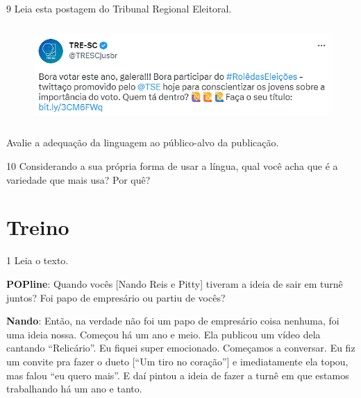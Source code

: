 \num{9} Leia esta postagem do Tribunal Regional Eleitoral.

\begin{figure}[H]
\centering
\includegraphics[width=5.26042in,height=1.47161in]{./imgSAEB_8_POR/media/image27.png}
\end{figure}

Avalie a adequação da linguagem ao público-alvo da publicação.


\num{10} Considerando a sua própria forma de usar a língua, qual você acha que é a variedade que mais usa? Por quê?


\section*{Treino}

\num{1} Leia o texto.

\begin{myquote}\textbf{POPline}: Quando vocês {[}Nando Reis e Pitty{]} tiveram a ideia
de sair em turnê juntos? Foi papo de empresário ou partiu de vocês?

\textbf{Nando}: Então, na verdade não foi um papo de empresário coisa
nenhuma, foi uma ideia nossa. Começou há um ano e meio. Ela publicou um
vídeo dela cantando ``Relicário''. Eu fiquei super emocionado. Começamos
a conversar. Eu fiz um convite pra fazer o dueto {[}``Um tiro no
coração''{]} e imediatamente ela topou, mas falou ``eu quero mais''. E daí pintou a ideia de fazer a turnê em que estamos trabalhando há um ano e tanto.
\end{myquote}

